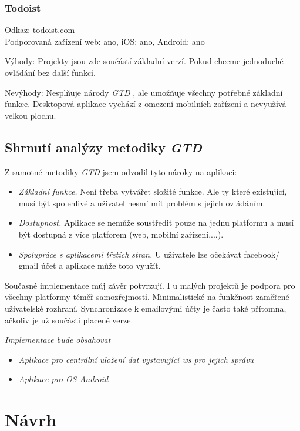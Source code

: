 \documentclass[thesis=B,czech]{FITthesis}[2012/06/26]
\newcommand{\GTD}{\textit{GTD }}
\begin{document}
\newpage
	
\subsection{Todoist}

Odkaz: todoist.com\\
Podporovaná zařízení web: ano, iOS: ano, Android: ano

Výhody:
Projekty jsou zde součástí základní verzí. Pokud chceme jednoduché ovládání bez další funkcí.

Nevýhody:
Nesplňuje národy \GTD, ale umožňuje všechny potřebné základní funkce. 
Desktopová aplikace vychází z omezení mobilních zařízení a nevyužívá velkou plochu. 

\section{Shrnutí analýzy metodiky \GTD}

Z samotné metodiky \GTD jsem odvodil tyto nároky na aplikaci:
\begin{itemize}
\item \textit{Základní funkce.}
Není třeba vytvářet složité funkce. Ale ty které existující, musí být spolehlivé a uživatel nesmí mít problém s jejich ovládáním. 
\item \textit{Dostupnost.}
Aplikace se nemůže soustředit pouze na jednu platformu a musí být dostupná z více platforem (web, mobilní zařízení,...). 
\item \textit{Spolupráce s aplikacemi třetích stran.}
U uživatele lze očekávat facebook/ gmail účet a aplikace může toto využít.
\end{itemize}

Současné implementace můj závěr potvrzují. I u malých projektů je podpora pro všechny platformy téměř samozřejmostí. Minimalistické na funkčnost zaměřené uživatelské rozhraní. Synchronizace k emailovými účty je často také přítomna, ačkoliv je už součásti placené verze.

\textit{Implementace bude obsahovat}
\begin{itemize}
\item \textit{Aplikace pro centrální uložení dat vystavující \acrshort{ws} pro jejich správu}
\item \textit{Aplikace pro OS Android}
\end{itemize}

\chapter{Návrh}
\end{document}
